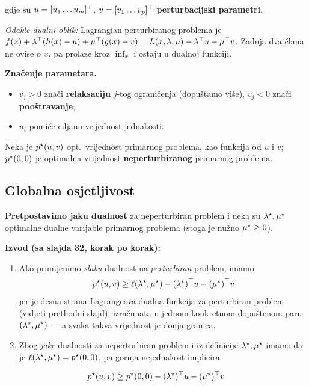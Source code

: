 gdje su $u = [u_1 \dots u_m]^{\top}$, $v = [v_1 \dots v_p]^{\top}$
\textbf{perturbacijski parametri}.

\emph{Odakle dualni oblik:} Lagrangian perturbiranog problema je
$f(x) + \lambda^{\top}(h(x) - u) + \mu^{\top}(g(x) - v)
= L(x,\lambda,\mu) - \lambda^{\top} u - \mu^{\top} v$. Zadnja dva člana ne ovise o $x$, pa
prolaze kroz $\inf_x$ i ostaju u dualnoj funkciji. \checkmark

\textbf{Značenje parametara.}
\begin{itemize}
  \item $v_j > 0$ znači \textbf{relaksaciju} $j$-tog ograničenja (dopuštamo
        više), $v_j < 0$ znači \textbf{pooštravanje};
  \item $u_i$ pomiče ciljanu vrijednost jednakosti.
\end{itemize}

Neka je $p^{\star}(u,v)$ opt.\ vrijednost primarnog problema, kao funkcija od $u$ i
$v$; $p^{\star}(0,0)$ je optimalna vrijednost \textbf{neperturbiranog} primarnog
problema.

\subsection{Globalna osjetljivost}

\textbf{Pretpostavimo jaku dualnost} za neperturbiran problem i neka su
$\lambda^{\star}, \mu^{\star}$ optimalne dualne varijable primarnog problema (stoga je
nužno $\mu^{\star} \ge 0$).

\textbf{Izvod (sa slajda 32, korak po korak):}

\begin{enumerate}
  \item Ako primijenimo \emph{slabu} dualnost na \emph{perturbiran} problem,
        imamo
        \[
        p^{\star}(u,v) \ge \ell(\lambda^{\star},\mu^{\star})
                     - (\lambda^{\star})^{\top} u - (\mu^{\star})^{\top} v
        \]
        jer je desna strana Lagrangeova dualna funkcija za perturbiran problem
        (vidjeti prethodni slajd), izračunata u jednom konkretnom dopuštenom
        paru $(\lambda^{\star},\mu^{\star})$ --- a svaka takva vrijednost je donja
        granica.
  \item Zbog \emph{jake} dualnosti za neperturbiran problem i iz definicije
        $\lambda^{\star},\mu^{\star}$ imamo da je
        $\ell(\lambda^{\star},\mu^{\star}) = p^{\star}(0,0)$, pa gornja nejednakost implicira
\end{enumerate}

\begin{teorem}
\begin{equation}
\label{eq:globalna-osjetljivost}
p^{\star}(u,v) \ge p^{\star}(0,0) - (\lambda^{\star})^{\top} u - (\mu^{\star})^{\top} v
\end{equation}
\end{teorem}


